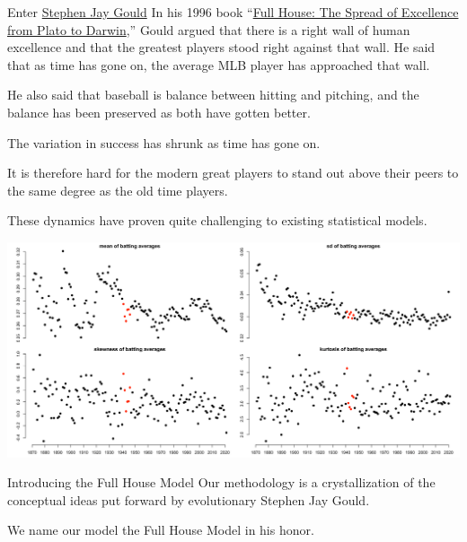 \documentclass[
  ignorenonframetext,
]{beamer}
\begin{document}
\begin{frame}{Enter
\href{https://en.wikipedia.org/wiki/Stephen_Jay_Gould}{Stephen Jay
Gould}}
\protect\hypertarget{enter-stephen-jay-gould}{}
In his 1996 book
``\href{https://en.wikipedia.org/wiki/Full_House:_The_Spread_of_Excellence_from_Plato_to_Darwin}{Full
House: The Spread of Excellence from Plato to Darwin},'' Gould argued
that there is a right wall of human excellence and that the greatest
players stood right against that wall. He said that as time has gone on,
the average MLB player has approached that wall.

\vspace{12pt}

He also said that baseball is balance between hitting and pitching, and
the balance has been preserved as both have gotten better.

\vspace{12pt}

The variation in success has shrunk as time has gone on.

\vspace{12pt}

It is therefore hard for the modern great players to stand out above
their peers to the same degree as the old time players.

\vspace{12pt}

These dynamics have proven quite challenging to existing statistical
models.
\end{frame}

\begin{frame}{}
\protect\hypertarget{section-6}{}
\includegraphics{4moments.png}
\end{frame}

\begin{frame}{Introducing the Full House Model}
\protect\hypertarget{introducing-the-full-house-model}{}
Our methodology is a crystallization of the conceptual ideas put forward
by evolutionary Stephen Jay Gould.

\vspace{12pt}

We name our model the Full House Model in his honor.
\end{frame}
\end{document}
